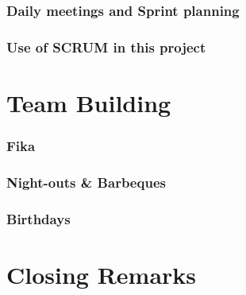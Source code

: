 \documentclass[11pt]{report}
\begin{document}
\subsection{Daily meetings and Sprint planning}
\subsection{Use of SCRUM in this project}
\chapter{Team Building}
\subsection{Fika}
\subsection{Night-outs \& Barbeques}
\subsection{Birthdays}
\chapter{Closing Remarks}
\end{document}
